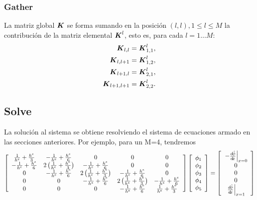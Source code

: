 \documentclass[a4paper,11pt,oneside]{article}
\begin{document}
\subsubsection*{Gather}
La matriz global $\boldsymbol{K}$ se forma sumando en la posición $(l,l), 1\leq l\leq M$ la
contribución de la matriz elemental $\boldsymbol{K}^l$, esto es, para cada $l=1\ldots M$:
\begin{align*}
  \boldsymbol{K}_{l,l}&=\boldsymbol{K}^l_{1,1},\\
\boldsymbol{K}_{l,l+1}&=\boldsymbol{K}^l_{1,2},\\
\boldsymbol{K}_{l+1,l}&=\boldsymbol{K}^l_{2,1},\\
\boldsymbol{K}_{l+1,l+1}&=\boldsymbol{K}^l_{2,2}.
\end{align*}
\subsection*{Solve}
La solución al sistema se obtiene resolviendo el sistema de ecuaciones armado
en las secciones anteriores. Por ejemplo, para un M=4, tendremos
\begin{align*}
  \left[
    \begin{array}{ccccc}
      \frac{1}{h^e}+\frac{h^e}{3} & -\frac{1}{h^e}+\frac{h^e}{6} & 0 & 0 & 0 \\
       -\frac{1}{h^e}+\frac{h^e}{6} & 2\left(\frac{1}{h^e}+\frac{h^e}{3}\right) &
       -\frac{1}{h^e}+\frac{h^e}{6} & 0 & 0 \\
       0 & -\frac{1}{h^e}+\frac{h^e}{6} & 2\left(\frac{1}{h^e}+\frac{h^e}{3}\right) &
       -\frac{1}{h^e}+\frac{h^e}{6} & 0\\
       0 & 0 & -\frac{1}{h^e}+\frac{h^e}{6} & 2\left(\frac{1}{h^e}+\frac{h^e}{3}\right) &
       -\frac{1}{h^e}+\frac{h^e}{6}\\
       0 & 0 & 0 & -\frac{1}{h^e}+\frac{h^e}{6} & \frac{1}{h^e}+\frac{h^e}{3}
    \end{array}
\right]
  \left[
    \begin{array}{c}
      \phi_1 \\ \phi_2 \\ \phi_3 \\ \phi_4\\ \phi_5
    \end{array}
\right]
=  \left[
    \begin{array}{c}
      \left.-\frac{d^{}\!\hat{\phi}}{d\!x^{}}\right|_{x=0}\\0 \\ 0\\ 0\\\left.\frac{d^{}\!\hat{\phi}}{d\!x^{}}\right|_{x=1}
    \end{array}
\right]
\end{align*}
\end{document}
